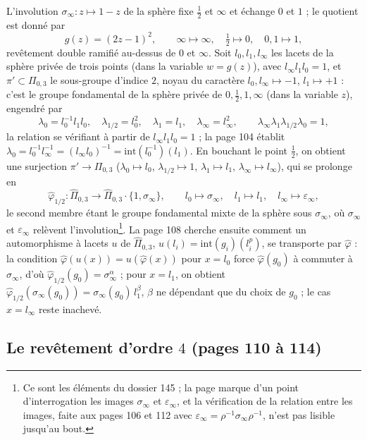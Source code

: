 \documentclass[11pt,a4paper]{article}
\begin{document}
L'involution $\sigma_\infty : z \mapsto 1 - z$ de la sphère fixe $\tfrac12$ et
$\infty$ et échange $0$ et $1$ ; le quotient est donné par
\[
g(z) = (2z - 1)^2, \qquad \infty \mapsto \infty, \quad \tfrac12 \mapsto 0, \quad 0, 1 \mapsto 1,
\]
revêtement double ramifié au-dessus de $0$ et $\infty$. Soit $l_0, l_1, l_\infty$
les lacets de la sphère privée de trois points (dans la variable $w = g(z)$),
avec $l_\infty l_1 l_0 = 1$, et $\pi' \subset \Pi_{0,3}$ le sous-groupe d'indice
$2$, noyau du caractère $l_0, l_\infty \mapsto -1$, $l_1 \mapsto +1$ : c'est le
groupe fondamental de la sphère privée de $0, \tfrac12, 1, \infty$ (dans la
variable $z$), engendré par
\[
\lambda_0 = l_0^{-1} l_1 l_0, \quad \lambda_{1/2} = l_0^2, \quad \lambda_1 = l_1, \quad \lambda_\infty = l_\infty^2,
\qquad \lambda_\infty\lambda_1\lambda_{1/2}\lambda_0 = 1,
\]
la relation se vérifiant à partir de $l_\infty l_1 l_0 = 1$ ; la page 104
établit $\lambda_0 = l_0^{-1}l_\infty^{-1} = (l_\infty l_0)^{-1} = \mathrm{int}(l_0^{-1})(l_1)$.
En bouchant le point $\tfrac12$, on obtient une surjection
$\pi' \to \Pi_{0,3}$ ($\lambda_0 \mapsto l_0$, $\lambda_{1/2} \mapsto 1$,
$\lambda_1 \mapsto l_1$, $\lambda_\infty \mapsto l_\infty$), qui se prolonge en
\[
\hat\varphi_{1/2} : \widehat{\Pi}_{0,3} \longrightarrow \widehat{\Pi}_{0,3} \cdot \{1, \sigma_\infty\},
\qquad l_0 \mapsto \sigma_\infty, \quad l_1 \mapsto l_1, \quad l_\infty \mapsto \varepsilon_\infty,
\]
le second membre étant le groupe fondamental mixte de la sphère sous
$\sigma_\infty$, où $\sigma_\infty$ et $\varepsilon_\infty$ relèvent
l'involution\footnote{Ce sont les éléments du dossier 145 ; la page marque
d'un point d'interrogation les images $\sigma_\infty$ et $\varepsilon_\infty$, et
la vérification de la relation entre les images, faite aux pages 106 et 112
avec $\varepsilon_\infty = \rho^{-1}\sigma_\infty\rho^{-1}$, n'est pas lisible
jusqu'au bout.}. La page 108 cherche ensuite comment un automorphisme à lacets
$u$ de $\widehat{\Pi}_{0,3}$, $u(l_i) = \mathrm{int}(g_i)(l_i^p)$, se transporte
par $\hat\varphi$ : la condition $\hat\varphi(u(x)) = u(\hat\varphi(x))$ pour
$x = l_0$ force $\hat\varphi(g_0)$ à commuter à $\sigma_\infty$, d'où
$\hat\varphi_{1/2}(g_0) = \sigma_\infty^{\alpha}$ ; pour $x = l_1$, on obtient
$\hat\varphi_{1/2}(\sigma_\infty(g_0)) = \sigma_\infty(g_0)\, l_1^{\beta}$, $\beta$
ne dépendant que du choix de $g_0$ ; le cas $x = l_\infty$ reste inachevé.

\subsection*{Le revêtement d'ordre $4$ (pages 110 à 114)}
\end{document}
